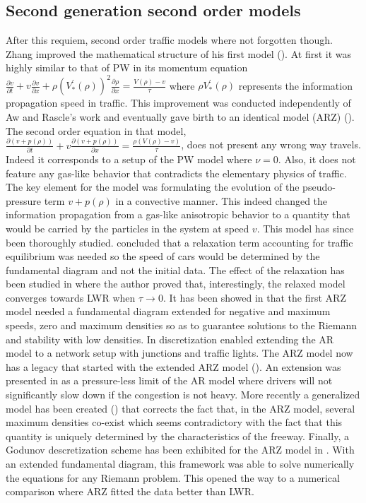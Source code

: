 \documentclass[preprint]{elsarticle}
\begin{document}
\subsection{Second generation second order models}
After this requiem, second order traffic models where not forgotten
though. Zhang improved the mathematical structure of his first model
(\cite{Zhang1998}). At first it was highly similar to that of PW
in its momentum equation $\frac{\partial v}{\partial t}+v\frac{\partial v}{\partial x}+\rho\left(V_{*}^{'}\left(\rho\right)\right)^{2}\frac{\partial\rho}{\partial x}=\frac{V\left(\rho\right)-v}{\tau}$
where $\rho V_{*}^{'}\left(\rho\right)$ represents the information
propagation speed in traffic. This improvement was conducted independently
of Aw and Rascle's work and eventually gave birth to an identical
model (ARZ) (\cite{AR,Z}). The second order equation in that model,
$\frac{\partial\left(v+p\left(\rho\right)\right)}{\partial t}+v\frac{\partial\left(v+p\left(\rho\right)\right)}{\partial x}=\frac{\rho\left(V\left(\rho\right)-v\right)}{\tau}$,
does not present any wrong way travels. Indeed it corresponds to a
setup of the PW model where $\nu=0$. Also, it does not feature any
gas-like behavior that contradicts the elementary physics of traffic.
The key element for the model was formulating the evolution of the
pseudo-pressure term $v+p\left(\rho\right)$ in a convective manner.
This indeed changed the information propagation from a gas-like anisotropic
behavior to a quantity that would be carried by the particles in the
system at speed $v$. This model has since been thoroughly studied.
\cite{AR} concluded that a relaxation term accounting for traffic
equilibrium was needed so the speed of cars would be determined by
the fundamental diagram and not the initial data. The effect of the
relaxation has been studied in \cite{R_improved} where the author
proved that, interestingly, the relaxed model converges towards LWR
when $\tau\rightarrow0$. It has been showed in \cite{Lebacque2007}
that the first ARZ model needed a fundamental diagram extended for
negative and maximum speeds, zero and maximum densities so as to guarantee
solutions to the Riemann and stability with low densities. In \cite{HybridLagrangian2007}
discretization enabled extending the AR model to a network setup with
junctions and traffic lights. The ARZ model now has a legacy that
started with the extended ARZ model (\cite{lebacque2007generic}).
An extension was presented in \cite{berthelin2008model} as a pressure-less
limit of the AR model where drivers will not significantly slow down
if the congestion is not heavy. More recently a generalized model
has been created (\cite{Fan}) that corrects the fact that, in the
ARZ model, several maximum densities co-exist which seems contradictory
with the fact that this quantity is uniquely determined by the characteristics
of the freeway. Finally, a Godunov descretization scheme has been
exhibited for the ARZ model in \cite{GodunovARZ}. With an extended
fundamental diagram, this framework was able to solve numerically the equations
for any Riemann problem. This opened the way to a numerical comparison
where ARZ fitted the data better than LWR.
\end{document}
